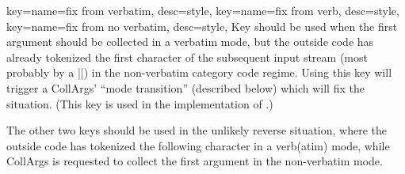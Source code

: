 \documentclass[a4paper,11pt]{article}
\begin{document}
\begin{doc}[
    pi={\docaux{cmd}{collargsFixFromVerbatim},
      \docaux{cmd}{collargsFixFromVerb},
      \docaux{cmd}{collargsFixFromNoVerbatim}},
  ]{
    key={name=fix from verbatim, desc=style},
    key={name=fix from verb, desc=style},
    key={name=fix from no verbatim, desc=style},
  }
  Key  should be used when the first
  argument should be collected in a verbatim mode, but the outside code has
  already tokenized the first character of the subsequent input stream (most
  probably by a |\futurelet|) in the non-verbatim category code regime.  Using
  this key will trigger a CollArgs' ``mode transition'' (described below) which
  will fix the situation.  (This key is used in the implementation of
  .)

  The other two keys should be used in the unlikely reverse situation, where
  the outside code has tokenized the following character in a verb(atim) mode,
  while CollArgs is requested to collect the first argument in the non-verbatim
  mode.
\end{doc}
\end{document}
